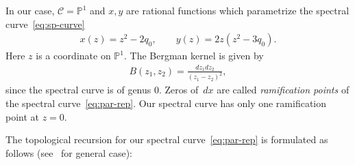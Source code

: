 In our case, ${\mathcal C} = {\mathbb P}^1$ and $x, y$ are
rational functions which parametrize the spectral curve~\eqref{eq:sp-curve}
\begin{gather} \label{eq:par-rep}
x(z) = z^{2} - 2 q_{0}, \qquad
y(z) = 2z(z^{2} - 3q_{0}).
\end{gather}
Here $z$ is a coordinate on ${\mathbb P}^1$.
The Bergman kernel is given by
\begin{gather*}
B(z_1, z_2) = \frac{dz_{1}dz_{2}}{(z_{1}-z_{2})^{2}},
\end{gather*}
since the spectral curve is of genus $0$.
Zeros of~$dx$ are called {\em ramification points} of the
spectral curve~\eqref{eq:par-rep}.
Our spectral curve has only one ramif\/ication point at $z=0$.

The topological recursion for our spectral curve~\eqref{eq:par-rep}
is formulated as follows (see~\cite{EO07} for general case):

